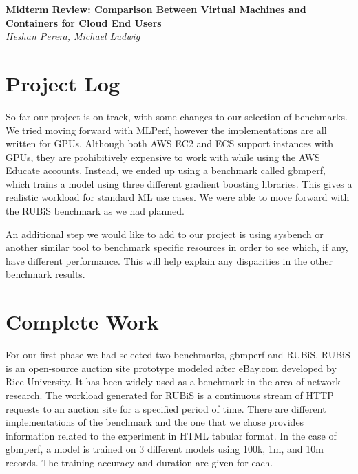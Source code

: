 \documentclass[11pt]{article}
\begin{document}
\renewcommand{\headrulewidth}{0pt} 
\renewcommand{\footrulewidth}{0pt} 
\pagestyle{fancy}
\cfoot{}
\lhead{}
\rhead{}
\lfoot{\itshape\textcolor{gray}{CS525T Cloud Computing Paper Review}}

\begin{center}
{\LARGE \bf Midterm Review: Comparison Between Virtual Machines and Containers for Cloud End Users} \\
{\normalsize \emph{Heshan Perera, Michael Ludwig}}\\

\end{center}

\section{Project Log}

So far our project is on track, with some changes to our selection of benchmarks. We tried moving forward with MLPerf, however the implementations are all written for GPUs. Although both AWS EC2 and ECS support instances with GPUs, they are prohibitively expensive to work with while using the AWS Educate accounts. Instead, we ended up using a benchmark called gbmperf, which trains a model using three different gradient boosting libraries. This gives a realistic workload for standard ML use cases. We were able to move forward with the RUBiS benchmark as we had planned. 

An additional step we would like to add to our project is using sysbench or another similar tool to benchmark specific resources in order to see which, if any, have different performance. This will help explain any disparities in the other benchmark results.

\section{Complete Work}

For our first phase we had selected two benchmarks, gbmperf and RUBiS. RUBiS is an open-source auction site prototype modeled after eBay.com developed by Rice University. It has been widely used as a benchmark in the area of network research. The workload generated for RUBiS is a continuous stream of HTTP requests to an auction site for a specified period of time. There are different implementations of the benchmark and the one that we chose provides information related to the experiment in HTML tabular format. In the case of gbmperf, a model is trained on 3 different models using 100k, 1m, and 10m records. The training accuracy and duration are given for each.
\end{document}
